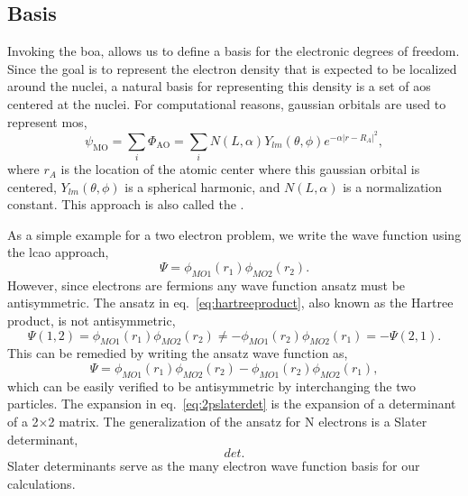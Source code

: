 \subsection{Basis}
Invoking the \gls{boa}, allows us to define a basis for the electronic degrees of freedom.
Since the goal is to represent the electron density that is expected to be localized around the nuclei, a natural basis for representing this density is a set of \glspl{ao} centered at the nuclei.
For computational reasons, gaussian orbitals are used to represent \glspl{mo},
\begin{equation}
\psi_{\textrm{MO}} = \sum_{i} \Phi_{\textrm{AO}} = \sum_{i} N(L, \alpha) Y_{lm}(\theta, \phi) e^{-\alpha |r - R_A|^2},
\end{equation}
where $r_A$ is the location of the atomic center where this gaussian orbital is centered, $Y_{lm}(\theta, \phi)$ is a spherical harmonic, and $N(L, \alpha)$ is a normalization constant.
This approach is also called the .

As a simple example for a two electron problem, we write the wave function using the \gls{lcao} approach,
\begin{equation}
\Psi = \phi_{MO1}(r_1) \phi_{MO2}(r_2).
\label{eq:hartreeproduct}
\end{equation}
However, since electrons are fermions any wave function ansatz must be antisymmetric.
The ansatz in eq.~\ref{eq:hartreeproduct}, also known as the Hartree product, is not antisymmetric,
\begin{equation}
\Psi(1,2) = \phi_{MO1}(r_1) \phi_{MO2}(r_2) \neq -\phi_{MO1}(r_2) \phi_{MO2}(r_1) = -\Psi(2,1).
\end{equation}
This can be remedied by writing the ansatz wave function as, 
\begin{equation}
\Psi = \phi_{MO1}(r_1) \phi_{MO2}(r_2) - \phi_{MO1}(r_2) \phi_{MO2}(r_1),
\label{eq:2pslaterdet}
\end{equation}
which can be easily verified to be antisymmetric by interchanging the two particles.
The expansion in eq.~\ref{eq:2pslaterdet} is the expansion of a determinant of a 2$\times$2 matrix.
The generalization of the ansatz for N electrons is a Slater determinant,
\begin{equation}
det.
\end{equation}
Slater determinants serve as the many electron wave function basis for our calculations.
